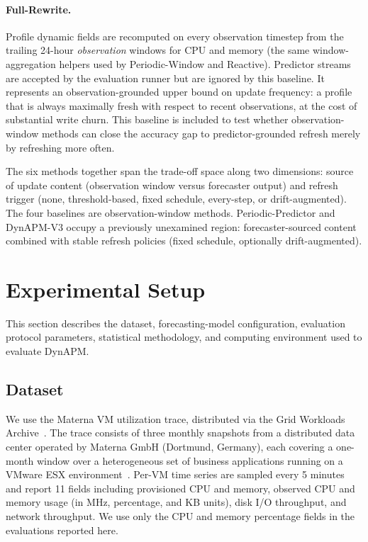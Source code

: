 \documentclass[manuscript,screen,review,anonymous]{acmart}
\begin{document}
\paragraph{Full-Rewrite.} Profile dynamic fields are recomputed on
every observation timestep from the trailing 24-hour
\emph{observation} windows for CPU and memory (the same
window-aggregation helpers used by Periodic-Window and Reactive).
Predictor streams are accepted by the evaluation runner but are
ignored by this baseline. It represents an observation-grounded
upper bound on update frequency: a profile that is always
maximally fresh with respect to recent observations, at the cost
of substantial write churn. This baseline is included to test
whether observation-window methods can close the accuracy gap to
predictor-grounded refresh merely by refreshing more often.

The six methods together span the trade-off space along two
dimensions: source of update content (observation window versus
forecaster output) and refresh trigger (none, threshold-based,
fixed schedule, every-step, or drift-augmented). The four
baselines are observation-window methods. Periodic-Predictor and
DynAPM-V3 occupy a previously unexamined region: forecaster-sourced
content combined with stable refresh policies (fixed schedule,
optionally drift-augmented).

\section{Experimental Setup}\label{sec:setup}

This section describes the dataset, forecasting-model
configuration, evaluation protocol parameters, statistical
methodology, and computing environment used to evaluate DynAPM.

\subsection{Dataset}\label{sec:setup-dataset}

We use the Materna VM utilization trace, distributed via the
Grid Workloads Archive~\cite{iosup_gwa_2008,materna_trace}. The
trace consists of three monthly snapshots from a distributed
data center operated by Materna GmbH (Dortmund, Germany), each
covering a one-month window over a heterogeneous set of business
applications running on a VMware ESX
environment~\cite{kohne_federatedcloudsim_2014,kohne_sla_vm_2016}.
Per-VM time series are sampled every 5 minutes and report 11
fields including provisioned CPU and memory, observed CPU and
memory usage (in MHz, percentage, and KB units), disk I/O
throughput, and network throughput. We use only the CPU and
memory percentage fields in the evaluations reported here.
\end{document}

